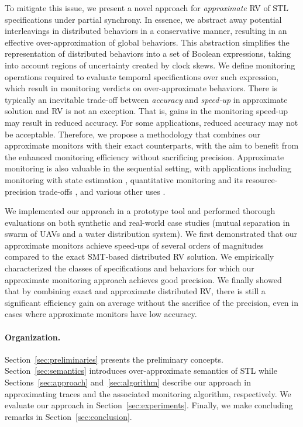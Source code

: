 To mitigate this issue, we present a novel approach for \emph{approximate} RV of STL 
specifications under partial synchrony.
%
In essence, we abstract away potential interleavings in distributed behaviors in a conservative 
manner, resulting in an effective over-approximation of global behaviors.
%
This abstraction simplifies the representation of distributed behaviors into a set of Boolean 
expressions, taking into account regions of uncertainty created by clock skews.
%
We define monitoring operations required to evaluate temporal specifications over such expression, 
which result in monitoring verdicts on over-approximate behaviors.
%
There is typically an inevitable trade-off between {\em accuracy} and {\em speed-up} in approximate 
solution and  RV is not an exception.
%
That is, gains in the monitoring speed-up may result in reduced accuracy.
%
For some applications, reduced accuracy may not be acceptable.
%
Therefore, we propose a methodology that combines our approximate monitors with their exact 
counterparts, with the aim to benefit from the enhanced monitoring efficiency without sacrificing 
precision.
%
\alert{
Approximate monitoring is also valuable in the sequential setting, with applications including
monitoring with state estimation \cite{StollerBSGHSZ11,BartocciG13},
quantitative monitoring and its resource-precision trade-offs \cite{HenzingerS21,HenzingerMS22,HenzingerMS23},
and various other uses \cite{AlechinaDL14,AcetoAFIL21}.
}


We implemented our approach in a prototype tool and performed thorough evaluations on both 
synthetic and real-world case studies (mutual separation in swarm of UAVs and a water distribution 
system).
%
We first demonstrated that our approximate monitors achieve speed-ups of several orders of 
magnitudes compared to the exact SMT-based distributed RV solution.
%
We empirically characterized the classes of specifications and behaviors for which our approximate 
monitoring approach achieves good precision.
%
We finally showed that by combining exact and approximate distributed RV, there is still a 
significant efficiency gain on average without the sacrifice of the precision, even in cases where 
approximate monitors have low accuracy. 

\paragraph{Organization.}
Section~\ref{sec:preliminaries} presents the preliminary concepts.
%
Section~\ref{sec:semantics} introduces over-approximate semantics of STL while 
Sections~\ref{sec:approach} and~\ref{sec:algorithm} describe our approach in approximating traces 
and the associated monitoring algorithm, respectively.
%
We evaluate our approach in Section~\ref{sec:experiments}. Finally, we make concluding remarks in 
Section~\ref{sec:conclusion}.